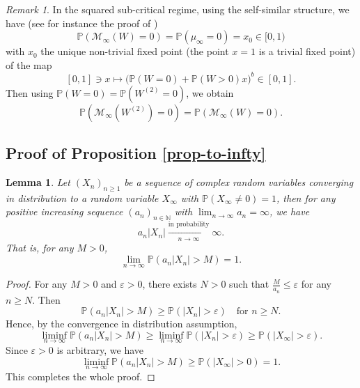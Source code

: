 \documentclass[12pt]{amsart}
\newtheorem{lemma}[theorem]{Lemma}
\theoremstyle{definition}
\theoremstyle{remark}
\newtheorem{remark}{Remark}[section]
\newcommand{\N}{\mathbb{N}}
\newcommand{\PP}{\mathbb{P}}
\numberwithin{equation}{section}
\begin{document}
 
\begin{remark}\label{rk-w-w2}
In the squared sub-critical regime, using the self-similar structure,  we have (see for instance the proof of  \cite[Proposition 3.3]{Heu}) 
\[
\PP(\mathscr{M}_\infty(W) = 0)=\PP(\mu_\infty = 0)  = x_0 \in [0,1)
\]
with $x_0$ the  unique non-trivial fixed point (the point $x=1$ is a trivial fixed point)  of the map 
\[
[0,1]\ni x\mapsto \big(\PP(W=0)+\PP(W>0)x\big)^b \in [0,1].
\] Then using  $\PP(W=0) = \PP(W^{(2)}=0)$, we obtain  
\[
\PP(\mathscr{M}_\infty(W^{(2)}) =0)   = \PP(\mathscr{M}_\infty(W) = 0). 
\]
\end{remark}

 
 
 
 
 
 
 
 
 
 
\subsection{Proof of Proposition \ref{prop-to-infty}}





\begin{lemma}\label{lemma-cov-law-con-one}
Let $(X_n)_{n\geq 1}$ be a sequence of complex random variables  converging in distribution to a  random variable $X_\infty$ with $\PP(X_\infty\neq 0)=1$, then for any positive increasing sequence $(a_n)_{n\in\N}$ with $\lim_{n\rightarrow\infty} a_n=\infty$, we have
\[
a_n|X_n|\xrightarrow[n\rightarrow\infty ]{\text{in probability}}  \infty.
\]
That is, for any $M>0$, 
\[
\lim_{n\rightarrow\infty} \PP(a_n|X_n|>M)=1.
\]
\end{lemma}

\begin{proof}
For  any $M>0$  and $\varepsilon>0$, there exists $N>0$ such that $\frac{M}{a_n}\leq \varepsilon$ for any $n\geq N$. Then 
\[
\PP(a_n|X_n|>M)\geq \PP(|X_n|>\varepsilon) \quad \text{for $n\geq N$}.
\]
Hence, by the convergence in distribution assumption, 
\[
\liminf_{n\rightarrow\infty} \PP(a_n|X_n|>M)\geq \liminf_{n\rightarrow\infty} \PP(|X_n|>\varepsilon) \ge \PP(|X_\infty|>\varepsilon).
\]
Since $\varepsilon>0$ is arbitrary, we have
\[
\liminf_{n\rightarrow\infty} \PP(a_n|X_n|>M)\geq \PP(|X_\infty|>0)=1.
\]
This completes the whole proof. 
\end{proof}
\end{document}
